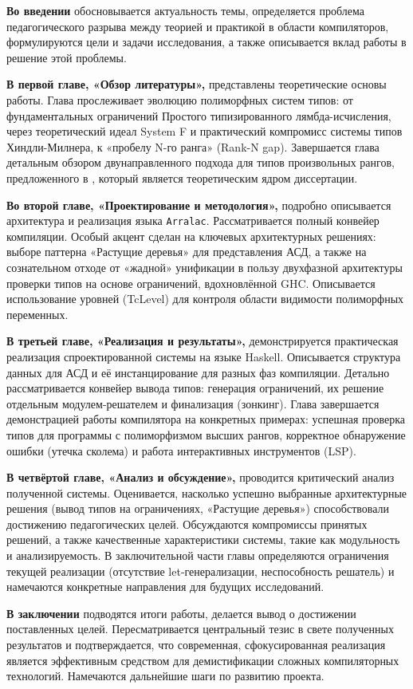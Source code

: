 \textbf{Во введении} обосновывается актуальность темы, определяется проблема педагогического разрыва между теорией и практикой в области компиляторов, формулируются цели и задачи исследования, а также описывается вклад работы в решение этой проблемы.

\textbf{В первой главе, «Обзор литературы»,} представлены теоретические основы работы. Глава прослеживает эволюцию полиморфных систем типов: от фундаментальных ограничений Простого типизированного лямбда-исчисления, через теоретический идеал System F и практический компромисс системы типов Хиндли-Милнера, к «пробелу N-го ранга» (Rank-N gap). Завершается глава детальным обзором двунаправленного подхода для типов произвольных рангов, предложенного в \cite{jones-practical-2007}, который является теоретическим ядром диссертации.

\textbf{Во второй главе, «Проектирование и методология»,} подробно описывается архитектура и реализация языка \texttt{Arralac}. Рассматривается полный конвейер компиляции. Особый акцент сделан на ключевых архитектурных решениях: выборе паттерна «Растущие деревья» для представления АСД, а также на сознательном отходе от «жадной» унификации в пользу двухфазной архитектуры проверки типов на основе ограничений, вдохновлённой GHC. Описывается использование уровней (TcLevel) для контроля области видимости полиморфных переменных.

\textbf{В третьей главе, «Реализация и результаты»,} демонстрируется практическая реализация спроектированной системы на языке Haskell. Описывается структура данных для АСД и её инстанцирование для разных фаз компиляции. Детально рассматривается конвейер вывода типов: генерация ограничений, их решение отдельным модулем-решателем и финализация (зонкинг). Глава завершается демонстрацией работы компилятора на конкретных примерах: успешная проверка типов для программы с полиморфизмом высших рангов, корректное обнаружение ошибки (утечка сколема) и работа интерактивных инструментов (LSP).

\textbf{В четвёртой главе, «Анализ и обсуждение»,} проводится критический анализ полученной системы. Оценивается, насколько успешно выбранные архитектурные решения (вывод типов на ограничениях, «Растущие деревья») способствовали достижению педагогических целей. Обсуждаются компромиссы принятых решений, а также качественные характеристики системы, такие как модульность и анализируемость. В заключительной части главы определяются ограничения текущей реализации (отсутствие let-генерализации, неспособность решатель) и намечаются конкретные направления для будущих исследований.

\textbf{В заключении} подводятся итоги работы, делается вывод о достижении поставленных целей. Пересматривается центральный тезис в свете полученных результатов и подтверждается, что современная, сфокусированная реализация является эффективным средством для демистификации сложных компиляторных технологий. Намечаются дальнейшие шаги по развитию проекта.